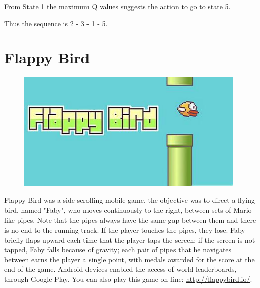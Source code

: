 \documentclass[a4paper, 11pt]{article}
\begin{document}
From State 1 the maximum Q values suggests the action to go to state 5.

Thus the sequence is 2 - 3 - 1 - 5.

\section{Flappy Bird}
\begin{figure}[ht]
\centering
\includegraphics[width=11cm]{Pic/bird}
\end{figure}
Flappy Bird was a side-scrolling mobile game, the objective was to direct a flying bird, named "Faby", who moves continuously to the right, between sets of Mario-like pipes. Note that the pipes always have the same gap between them and there is no end to the running track. If the player touches the pipes, they lose. Faby briefly flaps upward each time that the player taps the screen; if the screen is not tapped, Faby falls because of gravity; each pair of pipes that he navigates between earns the player a single point, with medals awarded for the score at the end of the game. Android devices enabled the access of world leaderboards, through Google Play. You can also play this game on-line: \url{http://flappybird.io/}.
\end{document}
